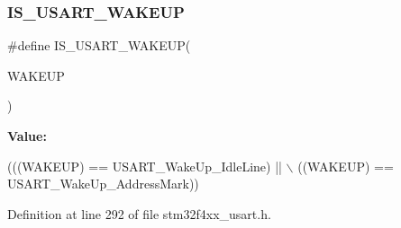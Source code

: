 \subsubsection{\texorpdfstring{I\+S\+\_\+\+U\+S\+A\+R\+T\+\_\+\+W\+A\+K\+E\+UP}{IS\_USART\_WAKEUP}}
{\footnotesize\ttfamily \#define I\+S\+\_\+\+U\+S\+A\+R\+T\+\_\+\+W\+A\+K\+E\+UP(\begin{DoxyParamCaption}\item[{}]{W\+A\+K\+E\+UP }\end{DoxyParamCaption})}

{\bfseries Value\+:}
\begin{DoxyCode}
(((WAKEUP) == USART\_WakeUp\_IdleLine) || \(\backslash\)
                                 ((WAKEUP) == USART\_WakeUp\_AddressMark))
\end{DoxyCode}


Definition at line 292 of file stm32f4xx\+\_\+usart.\+h.

